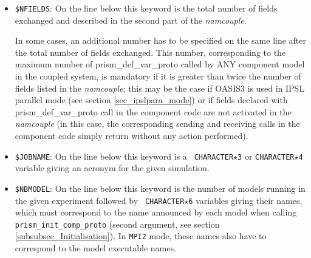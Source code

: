\begin{itemize}
%

\item {\tt \$NFIELDS}: On the line below this keyword is the total
number of fields exchanged and described in the second part of
the {\it namcouple}. 

In some cases, an additional number has to be specified on the same line after the total number of fields
exchanged. This number, corresponding to the maximum
number of prism\_def\_var\_proto called by ANY component model in the
coupled system, is mandatory if it is greater than twice the
number of fields listed in the {\it namcouple}; this may be the case
if OASIS3 is used in IPSL parallel mode (see section
\ref{sec_ipslpara_mode}) or if fields declared with
prism\_def\_var\_proto call in the component code are not activated in the {\it namcouple}
(in this case, the corresponding sending and receiving calls in the component code simply return without
any action performed).

\item {\tt \$JOBNAME}: On the line below this keyword is a {\tt
CHARACTER$\star$3} or {\tt CHARACTER$\star$4} variable giving an
acronym for the given simulation.

\item {\tt \$NBMODEL}: On the line below this keyword is the number of
models running in the given experiment followed by {\tt
CHARACTER$\star$6} variables giving their names, which must correspond to the name announced by each model when calling {\tt prism\_init\_comp\_proto} (second argument, see section \ref{subsubsec_Initialisation}). In {\tt MPI2} mode, these names also have to correspond to the model executable names. 


\end{itemize}

